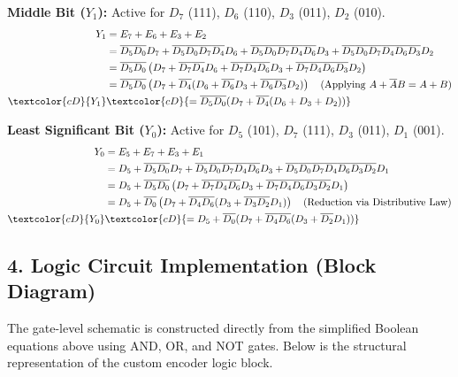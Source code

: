 \documentclass[12pt,a3paper]{article}
\begin{document}
\begin{enumerate}
\begin{tcolorbox}[enhanced,breakable,ansbox,colback=cD!4,colframe=cD,boxrule=0.8pt,arc=5pt,title={\textbf{Answer}},fonttitle=\bfseries\color{white},colbacktitle=cD]
\textbf{Middle Bit ($Y_1$):} Active for $D_7$ (111), $D_6$ (110), $D_3$ (011), $D_2$ (010).
\begin{align*}
    Y_1 &= E_7 + E_6 + E_3 + E_2 \\
    &= \overline{D_5}\overline{D_0}D_7 + \overline{D_5}\overline{D_0}\overline{D_7}\overline{D_4}D_6 + \overline{D_5}\overline{D_0}\overline{D_7}\overline{D_4}\overline{D_6}D_3 + \overline{D_5}\overline{D_0}\overline{D_7}\overline{D_4}\overline{D_6}\overline{D_3}D_2 \\
    &= \overline{D_5}\overline{D_0} \left( D_7 + \overline{D_7}\overline{D_4}D_6 + \overline{D_7}\overline{D_4}\overline{D_6}D_3 + \overline{D_7}\overline{D_4}\overline{D_6}\overline{D_3}D_2 \right) \\
    &= \overline{D_5}\overline{D_0} \left( D_7 + \overline{D_4} ( D_6 + \overline{D_6}D_3 + \overline{D_6}\overline{D_3}D_2 ) \right) \quad \text{(Applying $A + \overline{A}B = A + B$)} \\
    \textcolor{cD}{Y_1} &\textcolor{cD}{= \overline{D_5}\overline{D_0} (D_7 + \overline{D_4} (D_6 + D_3 + D_2))}
\end{align*}

\textbf{Least Significant Bit ($Y_0$):} Active for $D_5$ (101), $D_7$ (111), $D_3$ (011), $D_1$ (001).
\begin{align*}
    Y_0 &= E_5 + E_7 + E_3 + E_1 \\
    &= D_5 + \overline{D_5}\overline{D_0}D_7 + \overline{D_5}\overline{D_0}\overline{D_7}\overline{D_4}\overline{D_6}D_3 + \overline{D_5}\overline{D_0}\overline{D_7}\overline{D_4}\overline{D_6}\overline{D_3}\overline{D_2}D_1 \\
    &= D_5 + \overline{D_5}\overline{D_0} \left( D_7 + \overline{D_7}\overline{D_4}\overline{D_6}D_3 + \overline{D_7}\overline{D_4}\overline{D_6}\overline{D_3}\overline{D_2}D_1 \right) \\
    &= D_5 + \overline{D_0} \left( D_7 + \overline{D_4}\overline{D_6} ( D_3 + \overline{D_3}\overline{D_2}D_1 ) \right) \quad \text{(Reduction via Distributive Law)} \\
    \textcolor{cD}{Y_0} &\textcolor{cD}{= D_5 + \overline{D_0} (D_7 + \overline{D_4}\overline{D_6}(D_3 + \overline{D_2}D_1))}
\end{align*}

\subsection*{4. Logic Circuit Implementation (Block Diagram)}
The gate-level schematic is constructed directly from the simplified Boolean equations above using AND, OR, and NOT gates. Below is the structural representation of the custom encoder logic block.


\end{tcolorbox}
\end{enumerate}
\end{document}
